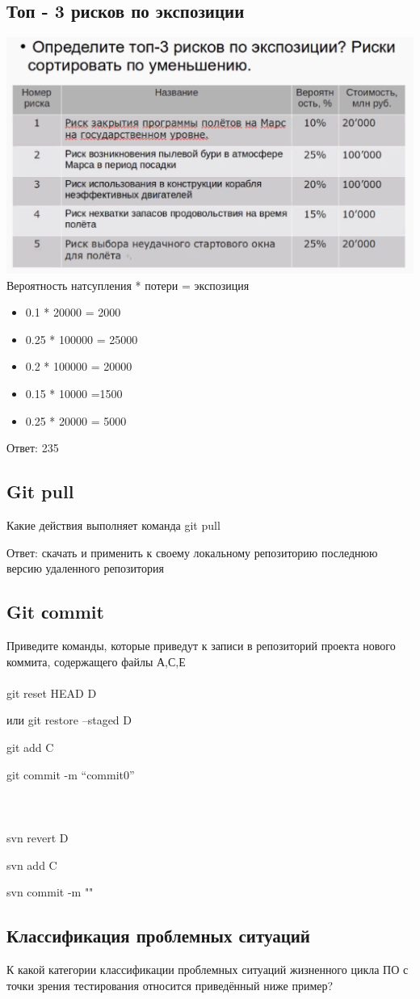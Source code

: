\documentclass{article}
\begin{document}
\subsection{Топ - 3 рисков по экспозиции}
\includegraphics[width=.4\textwidth]{risk.png}
\\
Вероятность натсупления * потери = экспозиция
\begin{itemize}
    \item 0.1 * 20000 = 2000
    \item 0.25 * 100000 = 25000
    \item 0.2 * 100000 = 20000
    \item 0.15 * 10000 =1500
    \item 0.25 * 20000 = 5000
\end{itemize}
Ответ: 235

\subsection{Git pull}

Какие действия выполняет команда git pull

Ответ: скачать и применить к своему локальному репозиторию последнюю версию удаленного репозитория

\subsection{Git сommit}

Приведите команды, которые приведут к записи в репозиторий проекта нового коммита, содержащего файлы А,С,Е
\\ \\
git reset HEAD D

или git restore --staged D

git add C

git commit -m “commit0”
\\ \\
\\ \\
svn revert D

svn add C

svn commit -m ""
\subsection{Классификация проблемных ситуаций}
К какой категории классификации проблемных ситуаций жизненного цикла ПО с точки зрения тестирования относится приведённый ниже пример?
\end{document}
